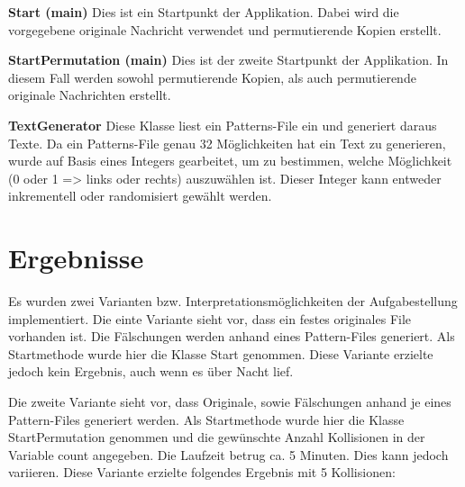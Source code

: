 \documentclass[10pt]{scrartcl}
\begin{document}
\textbf{Start (main)}\newline
Dies ist ein Startpunkt der Applikation. Dabei wird die vorgegebene originale Nachricht verwendet und permutierende Kopien erstellt.

\textbf{StartPermutation (main)}\newline
Dies ist der zweite Startpunkt der Applikation. In diesem Fall werden sowohl permutierende Kopien, als auch permutierende originale Nachrichten erstellt.

\textbf{TextGenerator}\newline
Diese Klasse liest ein Patterns-File ein und generiert daraus Texte. Da ein Patterns-File genau 32 Möglichkeiten hat ein Text zu generieren, wurde auf Basis eines Integers gearbeitet, um zu bestimmen, welche Möglichkeit (0 oder 1 => links oder rechts) auszuwählen ist. Dieser Integer kann entweder inkrementell oder randomisiert gewählt werden.
\section{Ergebnisse}
Es wurden zwei Varianten bzw. Interpretationsmöglichkeiten der Aufgabestellung implementiert.\newline
Die einte Variante sieht vor, dass ein festes originales File vorhanden ist. Die Fälschungen werden anhand eines Pattern-Files generiert.\newline
Als Startmethode wurde hier die Klasse Start genommen.
Diese Variante erzielte jedoch kein Ergebnis, auch wenn es über Nacht lief.

Die zweite Variante sieht vor, dass Originale, sowie Fälschungen anhand je eines Pattern-Files generiert werden.\newline
Als Startmethode wurde hier die Klasse StartPermutation genommen und die gewünschte Anzahl Kollisionen in der Variable count angegeben.\newline
Die Laufzeit betrug ca. 5 Minuten. Dies kann jedoch variieren.\newline
Diese Variante erzielte folgendes Ergebnis mit 5 Kollisionen:
\end{document}
